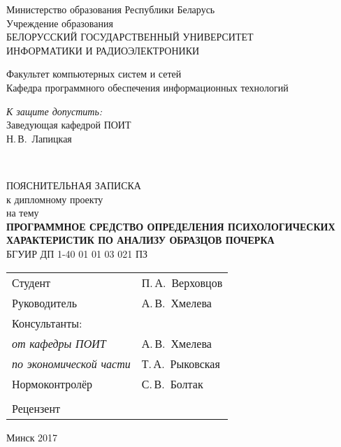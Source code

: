 \begin{titlepage}
  \begin{center}
    Министерство образования Республики Беларусь\\[1em]
    Учреждение образования\\
    БЕЛОРУССКИЙ ГОСУДАРСТВЕННЫЙ УНИВЕРСИТЕТ \\
    ИНФОРМАТИКИ И РАДИОЭЛЕКТРОНИКИ\\[1em]

    \begin{flushleft}
        Факультет компьютерных систем и сетей\\
        Кафедра программного обеспечения информационных технологий
    \end{flushleft}

    \begin{flushright}
      \begin{minipage}{0.4\textwidth}
        \textit{К защите допустить:}\\[0.8 em]
        Заведующая кафедрой ПОИТ\\[0.45 em]
        \underline{\hspace*{2.8 cm}} Н.\,В.~Лапицкая
      \end{minipage}\\[2.2 em]
    \end{flushright}


    {ПОЯСНИТЕЛЬНАЯ ЗАПИСКА}\\
    {к дипломному проекту}\\
    {на тему}\\[1em]
    \textbf{ПРОГРАММНОЕ СРЕДСТВО ОПРЕДЕЛЕНИЯ ПСИХОЛОГИЧЕСКИХ ХАРАКТЕРИСТИК ПО АНАЛИЗУ ОБРАЗЦОВ ПОЧЕРКА}\\[1em]


    {БГУИР ДП 1-40 01 01 03 021 ПЗ}\\[2em]

    \begin{tabular}{ p{}p{} }
      Студент & П.\,А.~Верховцов \\
      Руководитель & А.\,В.~Хмелева \\
      Консультанты: &\\
      \hspace*{3 ex}\emph{от кафедры ПОИТ} & А.\,В.~Хмелева \\
      \hspace*{3 ex}\emph{по экономической части} & Т.\,А.~Рыковская \\
      Нормоконтролёр & С.\,В.~Болтак\\
      & \\
      Рецензент &
    \end{tabular}

    \vfill
    {\normalsize Минск 2017}
  \end{center}
\end{titlepage}
